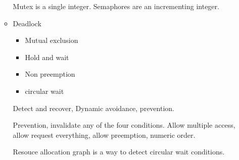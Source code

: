\documentclass{report}
\begin{document}
\begin{itemize}
\begin{itemize}
\begin{mdframed}
                    Mutex is a single integer. Semaphores are an incrementing integer.

                \end{mdframed}
            \item Deadlock
                \begin{itemize}
                    \item Mutual exclusion
                    \item Hold and wait
                    \item Non preemption
                    \item circular wait
                \end{itemize}
                \begin{mdframed}
                    Detect and recover,
                    Dynamic avoidance, 
                    prevention.

                    Prevention, invalidate any of the four conditions.
                    Allow multiple access, allow request everything,
                    allow preemption, numeric order.

                    Resouce allocation graph is a way to detect circular wait
                    conditions.
                \end{mdframed}
        \end{itemize}
\end{itemize}
\end{document}
